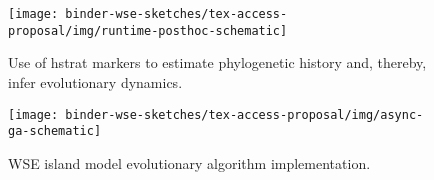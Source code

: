 \begin{figure*}
  \centering
  \begin{subfigure}[t]{0.43\linewidth}
    \centering
  \texttt{[image: binder-wse-sketches/tex-access-proposal/img/runtime-posthoc-schematic]}
    \caption{%
    Use of hstrat markers to estimate phylogenetic history and, thereby, infer evolutionary dynamics.
    }
    \label{fig:runtime-posthoc-schematic}
  \end{subfigure}
  \hspace{0.07\linewidth}
  \begin{subfigure}[t]{0.43\linewidth}
    \centering
  \texttt{[image: binder-wse-sketches/tex-access-proposal/img/async-ga-schematic]}
    \caption{WSE island model evolutionary algorithm implementation.}
    \label{fig:async-ga-schematic}
  \end{subfigure}

\caption{%
\textbf{Methods for distributed evolution simulation.}
\footnotesize
Subfigure \ref{fig:runtime-posthoc-schematic} shows use of hstrat markers to for reconstruct-based phylogenetic tracking of highly-distributed evolution simulations.
Subfigure \ref{fig:async-ga-schematic} summarizes asynchronous, callback-based approach to population exchange (``migration''') used to instantiate evolving populations across WSE PEs.
}
\label{fig:schematic}

\end{figure*}
